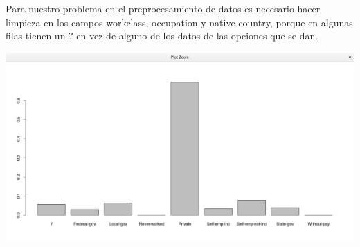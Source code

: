 \documentclass{article}
\begin{document}
Para nuestro problema en el preprocesamiento de datos es necesario hacer limpieza en los campos workclass, occupation y native-country, porque en algunas
filas tienen un ? en vez de alguno de los datos de las opciones que se dan. \\
\begin{center}
 \includegraphics[scale=0.3]{trabajos}\\
\end{center}
\end{document}
